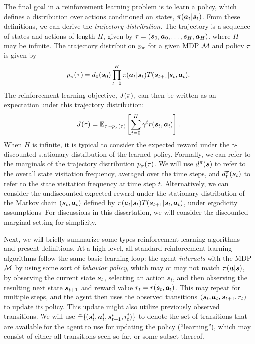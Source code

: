 \documentclass[../thesis.tex]{subfiles}
\begin{document}
The final goal in a reinforcement learning problem is to learn a policy, which defines a distribution over actions conditioned on states, $\pi(\boldsymbol{a}_t | \boldsymbol{s}_t)$. From these definitions, we can derive the \emph{trajectory distribution}. The trajectory is a sequence of states and actions of length $H$, given by $\tau = (\boldsymbol{s}_0, \boldsymbol{a}_0, \dots, \boldsymbol{s}_H, \boldsymbol{a}_H)$, where $H$ may be infinite. The trajectory distribution $p_\pi$ for a given MDP $\mathcal{M}$ and policy $\pi$ is given by
\[
p_\pi(\tau) = d_0(\boldsymbol{s}_0) \prod_{t=0}^H \pi(\boldsymbol{a}_t | \boldsymbol{s}_t) T(\boldsymbol{s}_{t+1} | \boldsymbol{s}_t, \boldsymbol{a}_t).
\]
The reinforcement learning objective, $J(\pi)$, can then be written as an expectation under this trajectory distribution:
\begin{equation}
J(\pi) = \mathbb{E}_{\tau \sim p_\pi(\tau)}\left[
\sum_{t=0}^H \gamma^t r(\boldsymbol{s}_t, \boldsymbol{a}_t)
\right]. \label{eq:rl_objective}
\end{equation}
When $H$ is infinite, it is typical to consider the expected reward under the $\gamma$-discounted stationary distribution of the learned policy. Formally, we can refer to the marginals of the trajectory distribution $p_\pi(\tau)$. We will use $d^\pi(\boldsymbol{s})$ to refer to the overall state visitation frequency, averaged over the time steps, and $d^\pi_t(\boldsymbol{s}_t)$ to refer to the state visitation frequency at time step $t$. Alternatively, we can consider the undiscounted expected reward under the stationary distribution of the Markov chain $(\boldsymbol{s}_t, \boldsymbol{a}_t)$ defined by $\pi(\boldsymbol{a}_t | \boldsymbol{s}_t) T(\boldsymbol{s}_{t+1} | \boldsymbol{s}_t, \boldsymbol{a}_t)$, under ergodicity assumptions. For discussions in this dissertation, we will consider the discounted marginal setting for simplicity.  


Next, we will briefly summarize some types reinforcement learning algorithms and present definitions. At a high level, all standard reinforcement learning algorithms follow the same basic learning loop: the agent \emph{interacts} with the MDP $\mathcal{M}$ by using some sort of \emph{behavior policy}, which may or may not match $\pi(\boldsymbol{a}|\boldsymbol{s})$, by observing the current state $\boldsymbol{s}_t$, selecting an action $\mathbf{a}_t$, and then observing the resulting next state $\boldsymbol{s}_{t+1}$ and reward value $r_t = r(\boldsymbol{s}_t,\boldsymbol{a}_t)$. This may repeat for multiple steps, and the agent then uses the observed transitions $(\boldsymbol{s}_t,\boldsymbol{a}_t,\boldsymbol{s}_{t+1},r_t)$ to update its policy. This update might also utilize previously observed transitions. We will use $\bar{=} \{ (\boldsymbol{s}^i_t,\boldsymbol{a}^i_t,\boldsymbol{s}^i_{t+1},r^i_t) \}$ to denote the set of transitions that are available for the agent to use for updating the policy (``learning''), which may consist of either all transitions seen so far, or some subset thereof.
\end{document}
